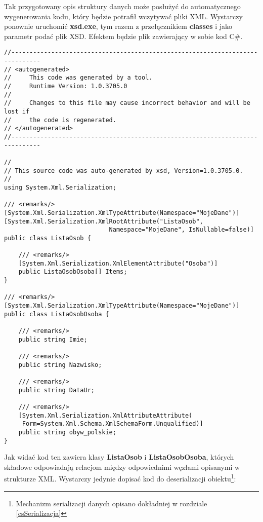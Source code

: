 Tak przygotowany opis struktury danych może posłużyć do automatycznego wygenerowania kodu, który
będzie potrafił wczytywać pliki XML. Wystarczy ponownie uruchomić {\bf xsd.exe}, tym razem z przełącznikiem
{\bf classes} i jako parametr podać plik XSD. Efektem będzie plik zawierający w sobie
kod C\#.

\begin{scriptsize}
\begin{verbatim}
//------------------------------------------------------------------------------
// <autogenerated>
//     This code was generated by a tool.
//     Runtime Version: 1.0.3705.0
//
//     Changes to this file may cause incorrect behavior and will be lost if 
//     the code is regenerated.
// </autogenerated>
//------------------------------------------------------------------------------

// 
// This source code was auto-generated by xsd, Version=1.0.3705.0.
// 
using System.Xml.Serialization;

/// <remarks/>
[System.Xml.Serialization.XmlTypeAttribute(Namespace="MojeDane")]
[System.Xml.Serialization.XmlRootAttribute("ListaOsob", 
                             Namespace="MojeDane", IsNullable=false)]
public class ListaOsob {
    
    /// <remarks/>
    [System.Xml.Serialization.XmlElementAttribute("Osoba")]
    public ListaOsobOsoba[] Items;
}

/// <remarks/>
[System.Xml.Serialization.XmlTypeAttribute(Namespace="MojeDane")]
public class ListaOsobOsoba {
    
    /// <remarks/>
    public string Imie;
    
    /// <remarks/>
    public string Nazwisko;
    
    /// <remarks/>
    public string DataUr;
    
    /// <remarks/>
    [System.Xml.Serialization.XmlAttributeAttribute(
     Form=System.Xml.Schema.XmlSchemaForm.Unqualified)]
    public string obyw_polskie;
}
\end{verbatim}
\end{scriptsize}

Jak widać kod ten zawiera klasy {\bf ListaOsob} i {\bf ListaOsobOsoba}, których składowe odpowiadają
relacjom między odpowiednimi węzłami opisanymi w strukturze XML. Wystarczy jedynie dopisać kod do 
deserializacji obiektu\footnote{Mechanizm serializacji danych opisano dokładniej w 
rozdziale \ref{csSerializacja}}:

